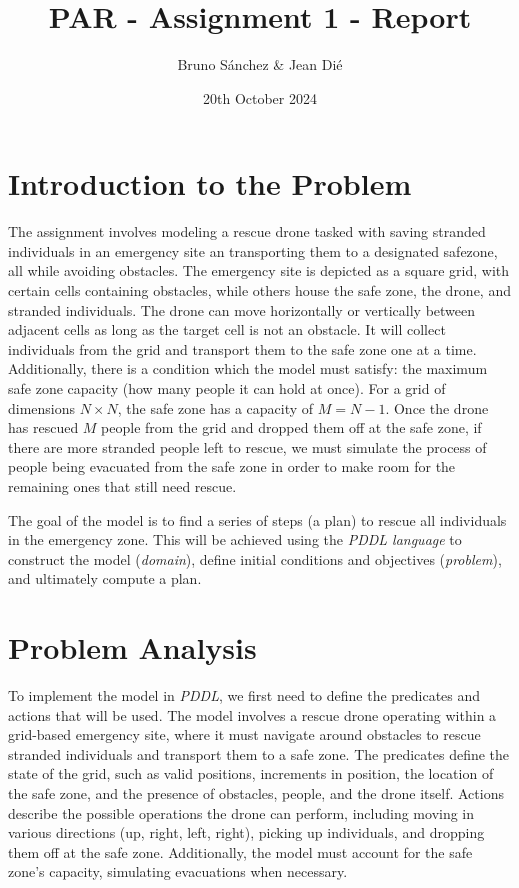 \documentclass{article}
\begin{document}

\title{PAR - Assignment 1 - Report}
\author{\normalsize Bruno Sánchez \& Jean Dié}
\date{\small 20th October 2024}

\maketitle

\section{Introduction to the Problem}

The assignment involves modeling a rescue drone tasked with saving stranded individuals in an emergency site an transporting them to a designated safezone, all while avoiding obstacles. The emergency site is depicted as a square grid, with certain cells containing obstacles, while others house the safe zone, the drone, and stranded individuals. The drone can move horizontally or vertically between adjacent cells as long as the target cell is not an obstacle. It will collect individuals from the grid and transport them to the safe zone one at a time. Additionally, there is a condition which the model must satisfy: the maximum safe zone capacity (how many people it can hold at once). For a grid of dimensions \(N \times N\), the safe zone has a capacity of \(M = N - 1\). Once the drone has rescued \(M\) people from the grid and dropped them off at the safe zone, if there are more stranded people left to rescue, we must simulate the process of people being evacuated from the safe zone in order to make room for the remaining ones that still need rescue.

The goal of the model is to find a series of steps (a plan) to rescue all individuals in the emergency zone. This will be achieved using the \textit{PDDL language} to construct the model (\textit{domain}), define initial conditions and objectives (\textit{problem}), and ultimately compute a plan.

\section{Problem Analysis}

To implement the model in \textit{PDDL}, we first need to define the predicates and actions that will be used. The model involves a rescue drone operating within a grid-based emergency site, where it must navigate around obstacles to rescue stranded individuals and transport them to a safe zone. The predicates define the state of the grid, such as valid positions, increments in position, the location of the safe zone, and the presence of obstacles, people, and the drone itself. Actions describe the possible operations the drone can perform, including moving in various directions (up, right, left, right), picking up individuals, and dropping them off at the safe zone. Additionally, the model must account for the safe zone's capacity, simulating evacuations when necessary.
\end{document}
